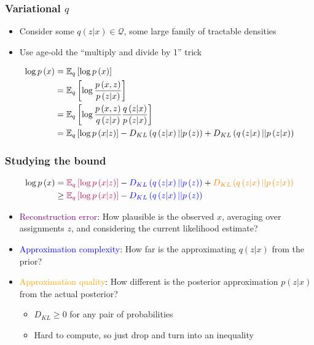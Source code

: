 \documentclass[10pt,mathserif]{beamer}
\begin{document}
\begin{frame}
  \frametitle{Variational $q$}
  \begin{itemize}
  \item Consider some $q\left(z \vert x\right) \in \mathcal{Q}$, some large
    family of tractable densities
  \item Use age-old the ``multiply and divide by 1'' trick
  \end{itemize}
  \begin{align*}
    \log p\left(x\right) &= \mathbb{E}_{q}\left[{\log p\left(x\right)}\right] \\
    &= \mathbb{E}_{q}\left[{\log \frac{p\left(x, z\right)}{p\left(z \vert x\right)}}\right] \\
    &= \mathbb{E}_{q}\left[{\log \frac{p\left(x, z\right)}{q\left(z \vert x\right)} \frac{q\left(z \vert x\right)}{p\left(z \vert x\right)}}\right] \\
    &= \mathbb{E}_{q}\left[{\log p\left(x \vert z\right)}\right] - D_{KL}\left(q\left(z \vert x\right) \vert \vert p\left(z\right)\right) + D_{KL}\left(q\left(z \vert x\right) \vert \vert p\left(z \vert x\right)\right)
  \end{align*}
\end{frame}

\begin{frame}
  \frametitle{Studying the bound}
  \begin{align*}
    \log p\left(x\right) &= \textcolor{purple}{\mathbb{E}_{q}\left[{\log p\left(x \vert z\right)}\right]} - \textcolor{blue}{D_{KL}\left(q\left(z \vert x\right) \vert \vert p\left(z\right)\right)} + \textcolor{orange}{D_{KL}\left(q\left(z \vert x\right) \vert \vert p\left(z \vert x\right)\right)} \\
     &\geq \textcolor{purple}{\mathbb{E}_{q}\left[{\log p\left(x \vert z\right)}\right]} - \textcolor{blue}{D_{KL}\left(q\left(z \vert x\right) \vert \vert p\left(z\right)\right)}
  \end{align*}
  \begin{itemize}
  \item \textcolor{purple}{Reconstruction error}: How plausible is the observed
    $x$, averaging over assignments $z$, and considering the current likelihood
    estimate?
  \item \textcolor{blue}{Approximation complexity}: How far is the approximating
    $q\left(z \vert x\right)$ from the prior?
  \item \textcolor{orange}{Approximation quality}: How different is the
    posterior approximation $p\left(z \vert x\right)$
    from the actual posterior?
    \begin{itemize}
    \item $D_{KL} \geq 0$ for any pair of probabilities
    \item Hard to compute, so just drop and turn into an inequality
    \end{itemize}
  \end{itemize}
\end{frame}
\end{document}
